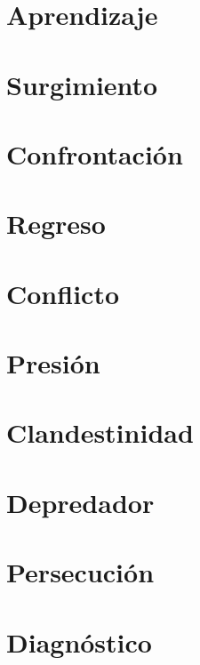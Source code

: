 \documentclass[11pt]{book}
\begin{document}
\chapter{Aprendizaje}


\chapter{Surgimiento}


\chapter{Confrontación}


\chapter{Regreso}


\chapter{Conflicto}


\chapter{Presión}


\chapter{Clandestinidad}


\chapter{Depredador}


\chapter{Persecución}


\chapter{Diagnóstico}

\end{document}

